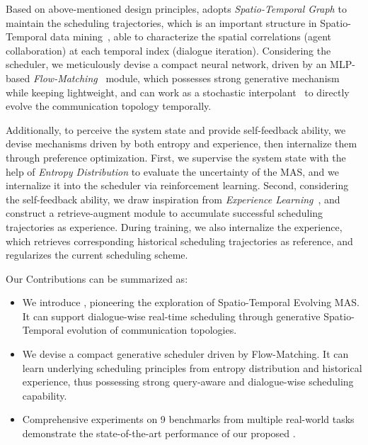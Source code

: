 Based on above-mentioned design principles, \ourmethod adopts \textit{Spatio-Temporal Graph} to maintain the scheduling trajectories, which is an important structure in Spatio-Temporal data mining~\citep{wang2020deep,yang2024survey}, able to characterize the spatial correlations (agent collaboration) at each temporal index (dialogue iteration). Considering the scheduler, we meticulously devise a compact neural network, driven by an MLP-based \textit{Flow-Matching}~\citep{FlowMatch} module, which possesses strong generative mechanism while keeping lightweight, and can work as a stochastic interpolant~\citep{wu2026aurora} to directly evolve the communication topology temporally.

Additionally, to perceive the system state and provide self-feedback ability, we devise mechanisms driven by both entropy and experience, then internalize them through preference optimization. First, we supervise the system state with the help of \textit{Entropy Distribution} to evaluate the uncertainty of the MAS, and we internalize it into the scheduler via reinforcement learning. Second, considering the self-feedback ability, we draw inspiration from \textit{Experience Learning}~\citep{zhang2025agent,tang2025chemagent}, and construct a retrieve-augment module to accumulate successful scheduling trajectories as experience. During training, we also internalize the experience, which retrieves corresponding historical scheduling trajectories as reference, and regularizes the current scheduling scheme.

Our Contributions can be summarized as:

\begin{itemize}[leftmargin=2em,itemsep=-0.1em]
\item[\ding{182}] We introduce \ourmethod, pioneering the exploration of Spatio-Temporal Evolving MAS. It can support dialogue-wise real-time scheduling through generative Spatio-Temporal evolution of communication topologies.
\item[\ding{183}] We devise a compact generative scheduler driven by Flow-Matching. It can learn underlying scheduling principles from entropy distribution and historical experience, thus possessing strong query-aware and dialogue-wise scheduling capability. 
\item[\ding{184}] Comprehensive experiments on 9 benchmarks from multiple real-world tasks demonstrate the state-of-the-art performance of our proposed \ourmethod. 
\end{itemize}

